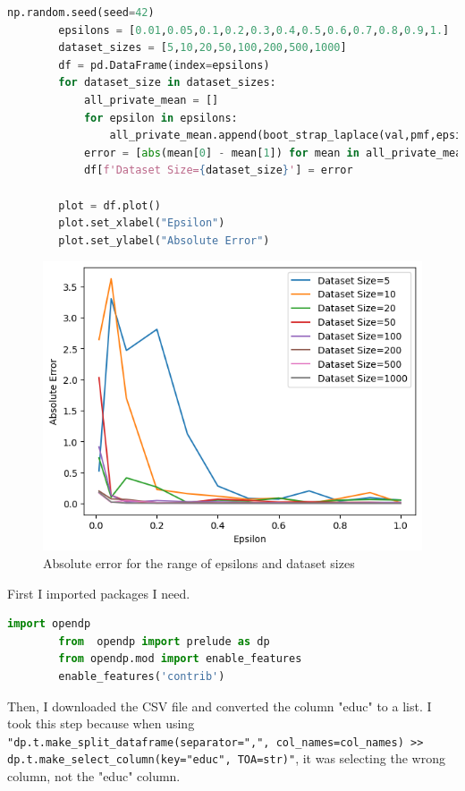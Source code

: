\documentclass[12pt]{extarticle}
\begin{document}
	\begin{lstlisting}[language=Python]
		np.random.seed(seed=42)
		epsilons = [0.01,0.05,0.1,0.2,0.3,0.4,0.5,0.6,0.7,0.8,0.9,1.]
		dataset_sizes = [5,10,20,50,100,200,500,1000]
		df = pd.DataFrame(index=epsilons)
		for dataset_size in dataset_sizes:
			all_private_mean = []
			for epsilon in epsilons:
				all_private_mean.append(boot_strap_laplace(val,pmf,epsilon,dataset_size,simulation_number=1000))
			error = [abs(mean[0] - mean[1]) for mean in all_private_mean]
			df[f'Dataset Size={dataset_size}'] = error
		
		plot = df.plot()
		plot.set_xlabel("Epsilon")
		plot.set_ylabel("Absolute Error")
	\end{lstlisting}
	\begin{figure}[h]
		\centering
		\includegraphics[width=1\textwidth]{im6.png}
		\caption{Absolute error for the range of epsilons and dataset sizes}
		\label{fig:fig6}
	\end{figure}
	First I imported packages I need.
	\begin{lstlisting}[language=Python]
		import opendp
		from  opendp import prelude as dp
		from opendp.mod import enable_features
		enable_features('contrib')
	\end{lstlisting}
	
	Then, I downloaded the CSV file and converted the column "educ" to a list. I took this step because when using \texttt{"dp.t.make\_split\_dataframe(separator=",", col\_names=col\_names) >> dp.t.make\_select\_column(key="educ", TOA=str)"}, it was selecting the wrong column, not the "educ" column.
	
\end{document}

